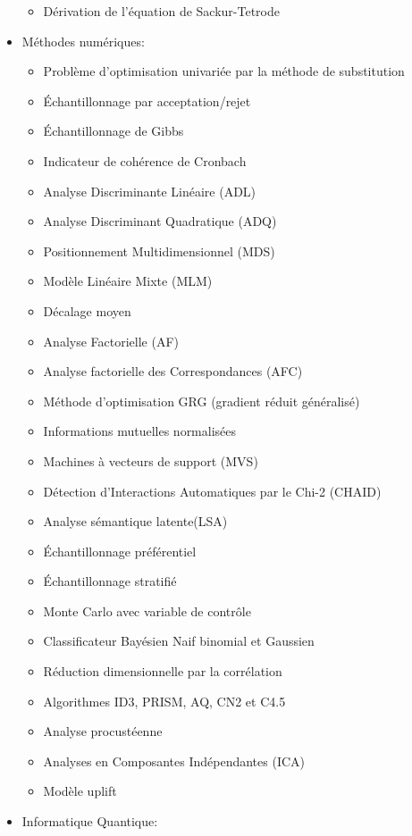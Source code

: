 \begin{itemize}
\begin{itemize}
				\item Dérivation de l'équation de Sackur-Tetrode
			\end{itemize}
		\item Méthodes numériques: 
			\begin{itemize}
				\item Problème d'optimisation univariée par la méthode de substitution				
				\item Échantillonnage par acceptation/rejet
				\item Échantillonnage de Gibbs
				\item Indicateur de cohérence de Cronbach
				\item Analyse Discriminante Linéaire (ADL)
				\item Analyse Discriminant Quadratique (ADQ)
				\item Positionnement Multidimensionnel (MDS)
				\item Modèle Linéaire Mixte (MLM)
				\item Décalage moyen
				\item Analyse Factorielle (AF)
				\item Analyse factorielle des Correspondances (AFC)
				\item Méthode d'optimisation GRG (gradient réduit généralisé)
				\item Informations mutuelles normalisées
				\item Machines à vecteurs de support (MVS)
				\item Détection d'Interactions Automatiques par le Chi-2 (CHAID)
				\item Analyse sémantique latente(LSA)
				\item Échantillonnage préférentiel 
				\item Échantillonnage stratifié
				\item Monte Carlo avec variable de contrôle
				\item Classificateur Bayésien Naif binomial et Gaussien
				\item Réduction dimensionnelle par la corrélation
				\item Algorithmes ID3, PRISM, AQ, CN2 et C4.5
				\item Analyse procustéenne
				\item Analyses en Composantes Indépendantes (ICA)
				\item Modèle uplift
			\end{itemize}
		\item Informatique Quantique: 
			\begin{itemize}

\end{itemize}
\end{itemize}
